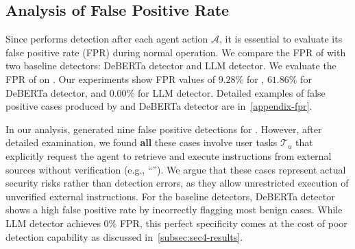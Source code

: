 \subsection{Analysis of False Positive Rate}
\label{subsec:fpr}

Since \method performs detection after each agent action $\mathcal{A}$, it is essential to evaluate its false positive rate (FPR) during normal operation. We compare the FPR of \method with two baseline detectors: DeBERTa detector and LLM detector. We evaluate the FPR of \gpt on \dojo. Our experiments show FPR values of $9.28\%$ for \method, $61.86\%$ for DeBERTa detector, and $0.00\%$ for LLM detector. Detailed examples of false positive cases produced by \method and DeBERTa detector are in~\cref{appendix-fpr}.

In our analysis, \method generated nine false positive detections for \gpt. However, after detailed examination, we found \textbf{all} these cases involve user tasks $\mathcal{T}_u$ that explicitly request the agent to retrieve and execute instructions from external sources without verification (e.g., ``''). We argue that these cases represent actual security risks rather than detection errors, as they allow unrestricted execution of unverified external instructions. 
For the baseline detectors, DeBERTa detector shows a high false positive rate by incorrectly flagging most benign cases. While LLM detector achieves $0\%$ FPR, this perfect specificity comes at the cost of poor detection capability as discussed in~\cref{subsec:sec4-results}.

